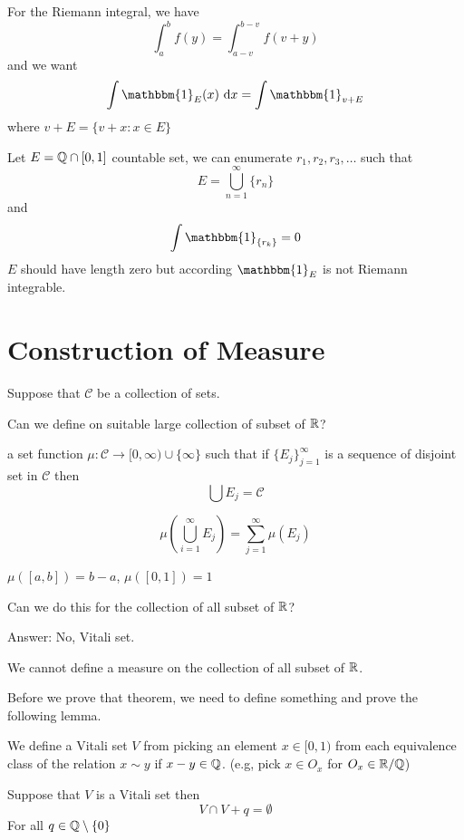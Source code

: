 \begin{example}
  For the Riemann integral, we have
  \[\int_a^b f(y) = \int_{a-v}^{b-v} f(v+y)\]
  and we want
  \[\int \mathbbm{1}_E(x)\ \mathrm{d}x = \int \mathbbm{1}_{v+E}\]
  where $v+E = \{v+x: x\in E\}$
\end{example}

Let $E = \mathbb Q \cap [0, 1]$ countable set, we can enumerate
$r_1, r_2, r_3, \dotsc$ such that 
\[E = \bigcup_{n=1}^{\infty}\{r_n\}\] and 
\[\int \mathbbm{1}_{\{r_k\}} = 0\]
$E$ should have length zero but according $\mathbbm{1}_E$ is not 
Riemann integrable.

\section{Construction of Measure}

Suppose that $\mathcal{C}$ be a collection of sets.

Can we define on suitable large collection of subset of $\mathbb R$?

a set function $\mu: \mathcal{C} \to [0, \infty) \cup \{\infty\}$ such that
if $\{E_j\}_{j=1}^\infty$ is a sequence of disjoint set in $\mathcal{C}$ then
\[\bigcup E_j = \mathcal{C}\]

\[\mu\left(\bigcup_{i=1}^\infty E_j\right) = \sum_{j=1}^\infty \mu(E_j)\]

$\mu([a, b]) = b-a$, $\mu([0, 1]) = 1$

Can we do this for the collection of all subset of $\mathbb R$?

Answer: No, Vitali set.

\begin{theorem}
  We cannot define a measure on the collection of all subset of $\mathbb R$.
\end{theorem}

Before we prove that theorem, we need to define something and prove the following lemma.

\begin{definition}
  We define a Vitali set $V$ from picking an element $x \in [0, 1)$ from each equivalence class of the relation $x \sim y$ if $x - y \in \mathbb Q$.
  (e.g, pick $x \in O_x$ for $O_x \in \mathbb R/\mathbb Q$)
\end{definition}

\begin{lemma}\label{lem:vitali}
  Suppose that $V$ is a Vitali set then 
  \[V \cap V+q = \emptyset\] 
  For all $q \in \mathbb Q \setminus \{0\}$
\end{lemma}

